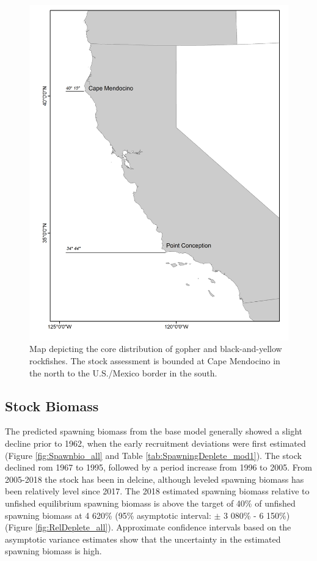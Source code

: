 \documentclass[12pt,]{article}
\begin{document}
\begin{figure}
\centering
\includegraphics{Figures/assess_region_map.png}
\caption{Map depicting the core distribution of gopher and
black-and-yellow rockfishes. The stock assessment is bounded at Cape
Mendocino in the north to the U.S./Mexico border in the south.
\label{fig:assess_region_map}}
\end{figure}

\FloatBarrier

\subsection*{Stock Biomass}\label{stock-biomass}

The predicted spawning biomass from the base model generally showed a
slight decline prior to 1962, when the early recruitment deviations were
first estimated (Figure \ref{fig:Spawnbio_all} and Table
\ref{tab:SpawningDeplete_mod1}). The stock declined rom 1967 to 1995,
followed by a period increase from 1996 to 2005. From 2005-2018 the
stock has been in delcine, although leveled spawning biomass has been
relatively level since 2017. The 2018 estimated spawning biomass
relative to unfished equilibrium spawning biomass is above the target of
40\% of unfished spawning biomass at 4 620\% (95\% asymptotic interval:
\(\pm\) 3 080\% - 6 150\%) (Figure \ref{fig:RelDeplete_all}).
Approximate confidence intervals based on the asymptotic variance
estimates show that the uncertainty in the estimated spawning biomass is
high. \FloatBarrier
\end{document}
